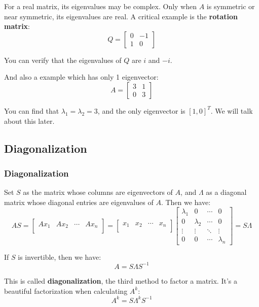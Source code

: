\documentclass[12pt]{ctexart}
\begin{document}
For a real matrix, its eigenvalues may be complex. Only when $A$ is symmetric or near
symmetric, its eigenvalues are real. A critical example is the \textbf{rotation matrix}:
\[
  Q = \begin{bmatrix}
    0 & -1 \\
    1 & 0
  \end{bmatrix}
\]

You can verify that the eigenvalues of $Q$ are $i$ and $-i$.

And also a example which has only 1 eigenvector:
\[
  A = \begin{bmatrix}
    3 & 1 \\
    0 & 3
  \end{bmatrix}
\]

You can find that $\lambda_1 = \lambda_2 = 3$, and the only eigenvector is
$[1, 0]^T$. We will talk about this later.

\subsection{\textbf{Diagonalization}}
\subsubsection{\textbf{Diagonalization}}

Set $S$ as the matrix whose columns are eigenvectors of $A$, and $\Lambda$ as a diagonal
matrix whose diagonal entries are eigenvalues of $A$. Then we have:
\[
  AS = \begin{bmatrix}
    Ax_1 & Ax_2 & \cdots & Ax_n \\
  \end{bmatrix} =
  \begin{bmatrix}
    x_1 & x_2 & \cdots & x_n \\
  \end{bmatrix}
  \begin{bmatrix}
    \lambda_1 & 0 & \cdots & 0 \\
    0 & \lambda_2 & \cdots & 0 \\
    \vdots & \vdots & \ddots & \vdots \\
    0 & 0 & \cdots & \lambda_n
  \end{bmatrix} = S\Lambda
\]

If $S$ is invertible, then we have:
\[
  A = S\Lambda S^{-1}
\]

This is called \textbf{diagonalization}, the third method to factor a matrix. It's a
beautiful factorization when calculating $A^k$:
\[
  A^k = S\Lambda^k S^{-1}
\]
\end{document}
